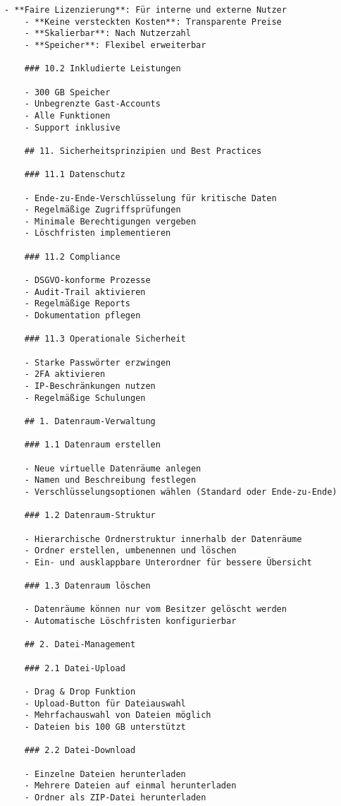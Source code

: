 \begin{Verbatim}[breaklines=true]
    - **Faire Lizenzierung**: Für interne und externe Nutzer
    - **Keine versteckten Kosten**: Transparente Preise
    - **Skalierbar**: Nach Nutzerzahl
    - **Speicher**: Flexibel erweiterbar
    
    ### 10.2 Inkludierte Leistungen
    
    - 300 GB Speicher
    - Unbegrenzte Gast-Accounts
    - Alle Funktionen
    - Support inklusive
    
    ## 11. Sicherheitsprinzipien und Best Practices
    
    ### 11.1 Datenschutz
    
    - Ende-zu-Ende-Verschlüsselung für kritische Daten
    - Regelmäßige Zugriffsprüfungen
    - Minimale Berechtigungen vergeben
    - Löschfristen implementieren
    
    ### 11.2 Compliance
    
    - DSGVO-konforme Prozesse
    - Audit-Trail aktivieren
    - Regelmäßige Reports
    - Dokumentation pflegen
    
    ### 11.3 Operationale Sicherheit
    
    - Starke Passwörter erzwingen
    - 2FA aktivieren
    - IP-Beschränkungen nutzen
    - Regelmäßige Schulungen
    
    ## 1. Datenraum-Verwaltung
    
    ### 1.1 Datenraum erstellen
    
    - Neue virtuelle Datenräume anlegen
    - Namen und Beschreibung festlegen
    - Verschlüsselungsoptionen wählen (Standard oder Ende-zu-Ende)
    
    ### 1.2 Datenraum-Struktur
    
    - Hierarchische Ordnerstruktur innerhalb der Datenräume
    - Ordner erstellen, umbenennen und löschen
    - Ein- und ausklappbare Unterordner für bessere Übersicht
    
    ### 1.3 Datenraum löschen
    
    - Datenräume können nur vom Besitzer gelöscht werden
    - Automatische Löschfristen konfigurierbar
    
    ## 2. Datei-Management
    
    ### 2.1 Datei-Upload
    
    - Drag & Drop Funktion
    - Upload-Button für Dateiauswahl
    - Mehrfachauswahl von Dateien möglich
    - Dateien bis 100 GB unterstützt
    
    ### 2.2 Datei-Download
    
    - Einzelne Dateien herunterladen
    - Mehrere Dateien auf einmal herunterladen
    - Ordner als ZIP-Datei herunterladen
    

\end{Verbatim}
